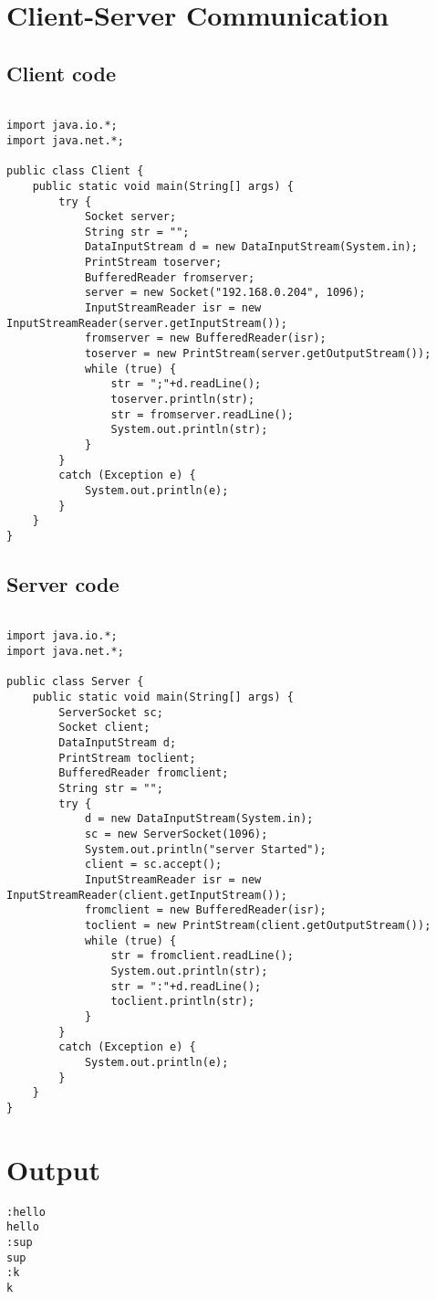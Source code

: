 \pagebreak{}
\section{Client-Server Communication}
\subsection{Client code}
\begin{verbatim}

import java.io.*;
import java.net.*;

public class Client {
    public static void main(String[] args) {
        try {
            Socket server;
            String str = "";
            DataInputStream d = new DataInputStream(System.in);
            PrintStream toserver;
            BufferedReader fromserver;
            server = new Socket("192.168.0.204", 1096);
            InputStreamReader isr = new InputStreamReader(server.getInputStream());
            fromserver = new BufferedReader(isr);
            toserver = new PrintStream(server.getOutputStream());
            while (true) {
                str = ";"+d.readLine();
                toserver.println(str);
                str = fromserver.readLine();
                System.out.println(str);
            }
        }
        catch (Exception e) {
            System.out.println(e);
        }
    }
}
\end{verbatim}
\pagebreak{}
\subsection{Server code}
\begin{verbatim}

import java.io.*;
import java.net.*;

public class Server {
    public static void main(String[] args) {
        ServerSocket sc;
        Socket client;
        DataInputStream d;
        PrintStream toclient;
        BufferedReader fromclient;
        String str = "";
        try {
            d = new DataInputStream(System.in);
            sc = new ServerSocket(1096);
            System.out.println("server Started");
            client = sc.accept();
            InputStreamReader isr = new InputStreamReader(client.getInputStream());
            fromclient = new BufferedReader(isr);
            toclient = new PrintStream(client.getOutputStream());
            while (true) {
                str = fromclient.readLine();
                System.out.println(str);
                str = ":"+d.readLine();
                toclient.println(str);
            }
        }
        catch (Exception e) {
            System.out.println(e);
        }
    }
}
\end{verbatim}
\section*{Output}
\begin{verbatim}
:hello
hello
:sup
sup
:k
k
\end{verbatim}